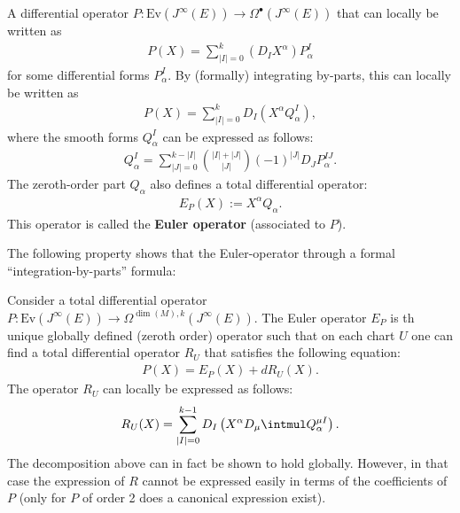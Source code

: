     \begin{property}
        A differential operator $P:\mathrm{Ev}(J^\infty(E))\rightarrow\Omega^\bullet(J^\infty(E))$ that can locally be written as
        \begin{gather}
            P(X) = \sum_{|I|=0}^k\left(D_IX^\alpha\right)P^I_\alpha
        \end{gather}
        for some differential forms $P^I_\alpha$. By (formally) integrating by-parts, this can locally be written as
        \begin{gather}
            P(X) = \sum_{|I|=0}^kD_I\left(X^\alpha Q^I_\alpha\right),
        \end{gather}
        where the smooth forms $Q^I_\alpha$ can be expressed as follows:
        \begin{gather}
            \label{var:Q_forms}
            Q^I_\alpha = \sum_{|J|=0}^{k-|I|}\binom{|I|+|J|}{|J|}(-1)^{|J|}D_JP^{IJ}_\alpha.
        \end{gather}
        The zeroth-order part $Q_\alpha$ also defines a total differential operator:
        \begin{gather}
            E_P(X) := X^\alpha Q_\alpha.
        \end{gather}
        This operator is called the \textbf{Euler operator} (associated to $P$).
    \end{property}
    The following property shows that the Euler-operator through a formal ``integration-by-parts'' formula:
    \begin{property}\label{var:differential_operator_decomposition}
        Consider a total differential operator $P:\mathrm{Ev}(J^\infty(E))\rightarrow\Omega^{\dim(M),k}(J^\infty(E))$. The Euler operator $E_P$ is th unique globally defined (zeroth order) operator such that on each chart $U$ one can find a total differential operator $R_U$ that satisfies the following equation:
        \begin{gather}
            P(X) = E_P(X) + dR_U(X).
        \end{gather}
        The operator $R_U$ can locally be expressed as follows:
        \begin{gather}
            R_U(X) = \sum_{|I|=0}^{k-1}D_I\left(X^\alpha D_\mu\intmul Q^{\mu I}_\alpha\right).
        \end{gather}
        The decomposition above can in fact be shown to hold globally. However, in that case the expression of $R$ cannot be expressed easily in terms of the coefficients of $P$ (only for $P$ of order 2 does a canonical expression exist).
    \end{property}

